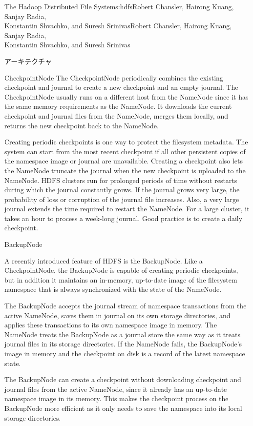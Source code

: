 \begin{aosachaptertoc}{The Hadoop Distributed File System}{s:hdfs}{Robert Chansler, Hairong Kuang, Sanjay Radia, \\ Konstantin Shvachko, and Suresh Srinivas}{Robert Chansler, Hairong Kuang, Sanjay Radia, \\ \hspace*{0.9cm} Konstantin Shvachko, and Suresh Srinivas}
\begin{aosasect1}{アーキテクチャ}
\begin{aosasect2}{CheckpointNode}
The CheckpointNode periodically combines the existing checkpoint and
journal to create a new checkpoint and an empty journal. The
CheckpointNode usually runs on a different host from the NameNode
since it has the same memory requirements as the NameNode. It
downloads the current checkpoint and journal files from the NameNode,
merges them locally, and returns the new checkpoint back to the
NameNode.

Creating periodic checkpoints is one way to protect the filesystem
metadata. The system can start from the most recent checkpoint if all
other persistent copies of the namespace image or journal are
unavailable. Creating a checkpoint also lets the NameNode truncate the
journal when the new checkpoint is uploaded to the NameNode.  HDFS
clusters run for prolonged periods of time without restarts during
which the journal constantly grows. If the journal grows very large,
the probability of loss or corruption of the journal file
increases. Also, a very large journal extends the time required to
restart the NameNode. For a large cluster, it takes an hour to process
a week-long journal. Good practice is to create a daily checkpoint.

\end{aosasect2}

\begin{aosasect2}{BackupNode}

A recently introduced feature of HDFS is the BackupNode. Like a
CheckpointNode, the BackupNode is capable of creating periodic
checkpoints, but in addition it maintains an in-memory, up-to-date
image of the filesystem namespace that is always synchronized with
the state of the NameNode.

The BackupNode accepts the journal stream of namespace transactions
from the active NameNode, saves them in journal on its own storage
directories, and applies these transactions to its own namespace image
in memory. The NameNode treats the BackupNode as a journal store the
same way as it treats journal files in its storage directories. If the
NameNode fails, the BackupNode's image in memory and the checkpoint on
disk is a record of the latest namespace state.

The BackupNode can create a checkpoint without downloading checkpoint
and journal files from the active NameNode, since it already has an
up-to-date namespace image in its memory. This makes the checkpoint
process on the BackupNode more efficient as it only needs to save the
namespace into its local storage directories.


\end{aosasect2}
\end{aosasect1}
\end{aosachaptertoc}
